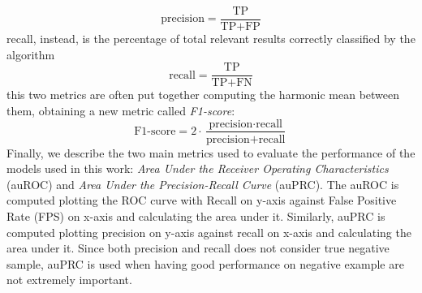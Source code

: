 \begin{equation}
    \textrm{precision} = \frac{\textrm{TP}}{\textrm{TP}+\textrm{FP}}
\end{equation}
recall, instead, is the percentage of total relevant results correctly classified by the algorithm 
\begin{equation}
    \textrm{recall} = \frac{\textrm{TP}}{\textrm{TP}+\textrm{FN}}
\end{equation}
this two metrics are often put together computing the harmonic mean between them, obtaining a new metric called \emph{F1-score}:
\begin{equation}
    \textrm{F1-score} = 2 \cdot \frac{\textrm{precision} \cdot \textrm{recall}}{\textrm{precision}+\textrm{recall}}
\end{equation}
Finally, we describe the two main metrics used to evaluate the performance of the models used in this work: \emph{Area Under the Receiver Operating Characteristics} (auROC) and \emph{Area Under the Precision-Recall Curve} (auPRC). 
The auROC is computed plotting the ROC curve with Recall on y-axis against False Positive Rate (FPS) on x-axis and calculating the area under it.  Similarly, auPRC is computed plotting precision on y-axis against recall on x-axis and calculating the area under it. Since both precision and recall does not consider true negative sample, auPRC is used when having good performance on negative example are not extremely important. 